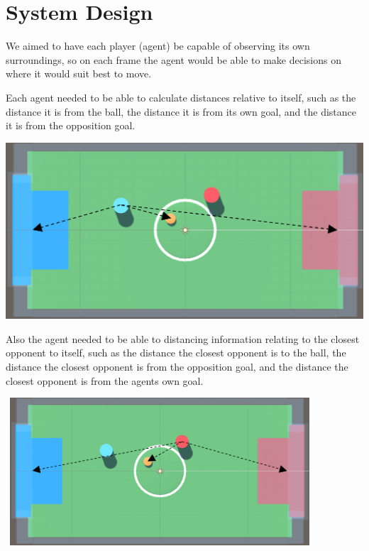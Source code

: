 
\chapter{System Design}
We aimed to have each player (agent) be capable of observing its own surroundings, so on each frame the agent would be able to make decisions on where it would suit best to move.

Each agent needed to be able to calculate distances relative to itself, such as the distance it is from the ball, the distance it is from its own goal, and the distance it is from the opposition goal.

\vspace{8mm}
\centering
\includegraphics[scale=0.2]{img/Image1.png}
\vspace{8mm}

\begin{flushleft}
Also the agent needed to be able to distancing information relating to the closest opponent to itself, such as the distance the closest opponent is to the ball, the distance the closest opponent is from the opposition goal, and the distance the closest opponent is from the agents own goal.
\end{flushleft}

\vspace{8mm}
\centering
\includegraphics[width=115mm, height=55mm]{img/Image2.png}
\vspace{8mm}

